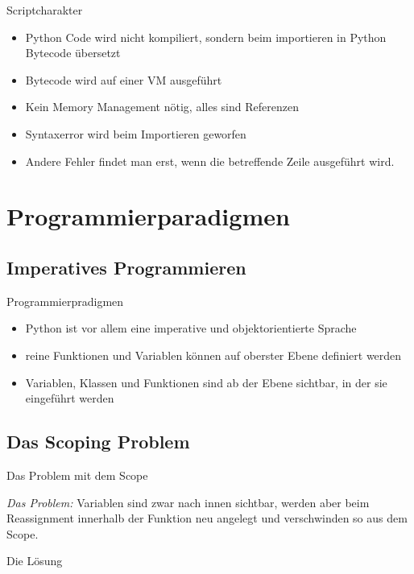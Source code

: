 \begin{frame}{Scriptcharakter}
	\begin{itemize}
		\item Python Code wird nicht kompiliert, sondern beim importieren in Python Bytecode übersetzt
		\item Bytecode wird auf einer VM ausgeführt
		\item Kein Memory Management nötig, alles sind Referenzen
		\item Syntaxerror wird beim Importieren geworfen
		\item Andere Fehler findet man erst, wenn die betreffende Zeile ausgeführt wird.
	\end{itemize}
\end{frame}



\section{Programmierparadigmen}
\subsection{Imperatives Programmieren}
\begin{frame}[fragile]{Programmierpradigmen}
	\begin{itemize}
		\item Python ist vor allem eine imperative und objektorientierte Sprache
		\item reine Funktionen und Variablen können auf oberster Ebene definiert werden
		\item Variablen, Klassen und Funktionen sind ab der Ebene sichtbar, in der sie eingeführt werden
	\end{itemize}
\end{frame}

\subsection{Das Scoping Problem}
\begin{frame}[fragile]{Das Problem mit dem Scope}
	
	\textit{Das Problem:} Variablen sind zwar nach innen sichtbar, werden aber beim Reassignment innerhalb der Funktion neu angelegt und verschwinden so aus dem Scope.
\end{frame}

\begin{frame}[fragile]{Die Lösung}
	
\end{frame}

